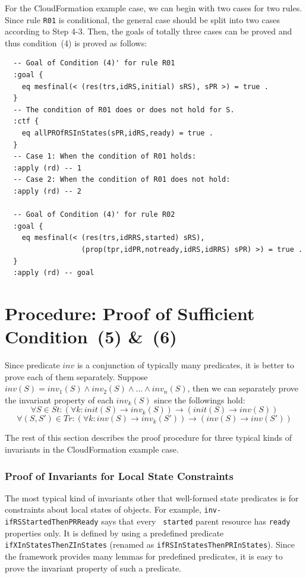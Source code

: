 \documentclass[12pt]{report}
\newcommand{\ra}{\rightarrow}
\begin{document}
For the CloudFormation example case, we can begin with two cases for
two rules. Since rule {\tt R01} is conditional, the general case
should be split into two cases according to Step 4-3. Then, the goals
of totally three cases can be proved and thus condition~(4) is proved
as follows:
\small
\begin{verbatim}
  -- Goal of Condition (4)' for rule R01
  :goal {
    eq mesfinal(< (res(trs,idRS,initial) sRS), sPR >) = true .
  }
  -- The condition of R01 does or does not hold for S.
  :ctf {
    eq allPROfRSInStates(sPR,idRS,ready) = true .
  }
  -- Case 1: When the condition of R01 holds:
  :apply (rd) -- 1
  -- Case 2: When the condition of R01 does not hold:
  :apply (rd) -- 2

  -- Goal of Condition (4)' for rule R02
  :goal {
    eq mesfinal(< (res(trs,idRRS,started) sRS),
                  (prop(tpr,idPR,notready,idRS,idRRS) sPR) >) = true .
  }
  :apply (rd) -- goal
\end{verbatim}
\normalsize

\section{Procedure: Proof of Sufficient Condition~(5) \&~(6)}
\label{sec:invariant}
Since predicate $inv$ is a conjunction of typically many predicates, it is
better to prove each of them separately. Suppose $inv(S) =
inv_1(S)\land inv_2(S)\land\dots\land inv_n(S)$, then we can
separately prove the invariant property of each $inv_k(S)$ since the
followings hold:
\[\forall S\in St: (\forall k:init(S)\ra inv_k(S))\ra(init(S)\ra inv(S))\]
\[\forall (S,S')\in \mathit{Tr}: (\forall k:inv(S)\ra inv_k(S'))\ra(inv(S)\ra inv(S'))\]

\vspace{0.3cm}
The rest of this section describes the proof procedure for three
typical kinds of invariants in the CloudFormation example case.

\subsubsection*{Proof of Invariants for Local State Constraints}
The most typical kind of invariants other that well-formed state
predicates is for constraints about local states of objects.  For
example, {\tt inv-ifRSStartedThenPRReady} says that every {\tt
  started} parent resource has {\tt ready} properties only.  It is
defined by using a predefined predicate {\tt ifXInStatesThenZInStates}
(renamed as {\tt ifRSInStatesThenPRInStates}). Since the framework
provides many lemmas for predefined predicates, it is easy to
prove the invariant property of such a predicate. \\
\end{document}
